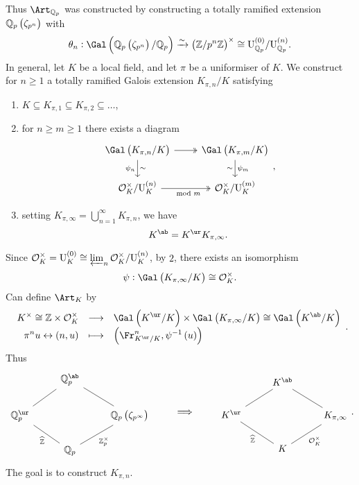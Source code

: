 Thus $ \Art_{\QQ_p} $ was constructed by constructing a totally ramified extension $ \QQ_p\br{\zeta_{p^n}} $ with
$$ \theta_n : \Gal\br{\QQ_p\br{\zeta_{p^n}} / \QQ_p} \xrightarrow{\sim} \br{\ZZ / p^n\ZZ}^\times \cong \U_{\QQ_p}^{\br{0}} / \U_{\QQ_p}^{\br{n}}. $$
In general, let $ K $ be a local field, and let $ \pi $ be a uniformiser of $ K $. We construct for $ n \ge 1 $ a totally ramified Galois extension $ K_{\pi, n} / K $ satisfying
\begin{enumerate}
\item $ K \subseteq K_{\pi, 1} \subseteq K_{\pi, 2} \subseteq \dots $,
\item for $ n \ge m \ge 1 $ there exists a diagram
$$
\begin{tikzcd}
\Gal\br{K_{\pi, n} / K} \arrow[twoheadrightarrow]{r} \arrow{d}{\sim}[swap]{\psi_n} & \Gal\br{K_{\pi, m} / K} \arrow{d}{\psi_m}[swap]{\sim} \\
\OOO_K^\times / \U_K^{\br{n}} \arrow[twoheadrightarrow]{r}[swap]{\mod m} & \OOO_K^\times / \U_K^{\br{m}}
\end{tikzcd},
$$
\item setting $ K_{\pi, \infty} = \bigcup_{n = 1}^\infty K_{\pi, n} $, we have
$$ K^{\ab} = K^{\ur}K_{\pi, \infty}. $$
\end{enumerate}
Since $ \OOO_K^\times = \U_K^{\br{0}} \cong \varprojlim_n \OOO_K^\times / \U_K^{\br{n}} $, by $ 2 $, there exists an isomorphism
$$ \psi : \Gal\br{K_{\pi, \infty} / K} \cong \OOO_K^\times. $$
Can define $ \Art_K $ by
$$ \function{K^\times \cong \ZZ \times \OOO_K^\times}{\Gal\br{K^{\ur} / K} \times \Gal\br{K_{\pi, \infty} / K} \cong \Gal\br{K^{\ab} / K}}{\pi^nu \leftrightarrow \br{n, u}}{\br{\Fr_{K^{\ur} / K}^n, \psi^{-1}\br{u}}}. $$
Thus
$$
\begin{tikzcd}
& \QQ_p^{\ab} \arrow[dash]{dl} \arrow[dash]{dr} & \\
\QQ_p^{\ur} \arrow[dash]{dr}[swap]{\widehat{\ZZ}} & & \QQ_p\br{\zeta_{p^\infty}} \arrow[dash]{dl}{\ZZ_p^\times} \\
& \QQ_p &
\end{tikzcd}
\qquad \implies \qquad
\begin{tikzcd}
& K^{\ab} \arrow[dash]{dl} \arrow[dash]{dr} & \\
K^{\ur} \arrow[dash]{dr}[swap]{\widehat{\ZZ}} & & K_{\pi, \infty} \arrow[dash]{dl}{\OOO_K^\times} \\
& K &
\end{tikzcd}.
$$
The goal is to construct $ K_{\pi, n} $.

\pagebreak

